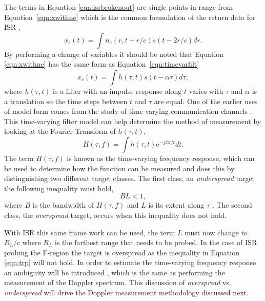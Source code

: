 The terms in Equation \ref{eqn:isrbrokenout} are single points in range from Equation~\ref{eqn:xwithne} which is the common formulation of the return data for ISR \cite{hysell2008}, 
\begin{equation}
\label{eqn:xwithne}
x_c(t)= \int n_e(r,t-r/c)s(t-2r/c)  dr.
\end{equation}
By performing a change of variables it should be noted that Equation \ref{eqn:xwithne} has the same form as Equation~\ref{eqn:timevarfilt}
\begin{equation}
\label{eqn:timevarfilt}
x_c(t)= \int h(\tau,t)s(t-\alpha\tau)  d\tau,
\end{equation}
where $h(\tau,t)$ is a filter with an impulse response along $t$ varies with $\tau$ and $\alpha$ is a translation so the time steps between $t$ and $\tau$ are equal.  One of the earlier uses of model  form comes from the study of time varying communication channels \cite{Kailath:1962jx,Kailath:1963gh}. This time-varying filter model can help determine the method of measurement by looking at the Fourier Transform of $h(\tau,t)$,
\begin{equation}
\label{eqn:timvarefreq}
H(\tau,f)=\int h(\tau,t)\text{e}^{-j2\pi ft}dt.
\end{equation}
The term $H(\tau,f)$ is known as the time-varying frequency response, which can be used to determine how the function can be measured and does this by distinguishing two different target classes. The first class, an \textit{underspread} target the following inequality must hold,
\begin{equation}
\label{eqn:trp}
BL<1,
\end{equation}
where $B$ is the bandwidth of $H(\tau,f)$ and $L$ is its extent along $\tau$ \cite{Kay:2003jl,Pfander:2015ea}. The second class, the \textit{overspread} target, occurs when this inequality does not hold.

With ISR this same frame work can be used, the term $L$ must now change to $R_L/c$ where $R_L$ is the farthest range that needs to be probed. In the case of ISR probing the F-region the target is overspread as the inequality in Equation \ref{eqn:trp} will not hold. In order to estimate the time-varying frequency response an ambiguity will be introduced \cite{Kailath:1962jx,Kailath:1963gh}, which is the same as performing the measurement of the Doppler spectrum. This discussion of \textit{overspread} vs. \textit{underspread} will drive the Doppler measurement methodology discussed next.




